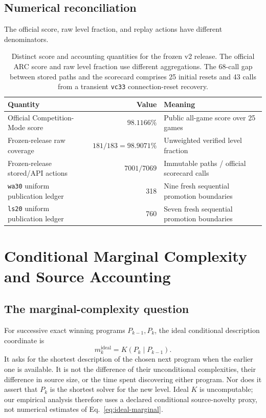 \documentclass[11pt]{article}
\theoremstyle{definition}
\theoremstyle{remark}
\begin{document}
\subsection{Numerical reconciliation}
The official score, raw level fraction, and replay actions have different denominators.
\begin{table}[H]
\centering
\small
\begin{tabularx}{\textwidth}{@{}p{}rX@{}}
\toprule
Quantity & Value & Meaning \\
\midrule
Official Competition-Mode score & $98.1166\%$ & Public all-game score over 25 games \\
Frozen-release raw coverage & $181/183=98.9071\%$ & Unweighted verified level fraction \\
Frozen-release stored/API actions & $7001/7069$ & Immutable paths / official scorecard calls \\
\texttt{wa30} uniform publication ledger & 318 & Nine fresh sequential promotion boundaries \\
\texttt{ls20} uniform publication ledger & 760 & Seven fresh sequential promotion boundaries \\
\bottomrule
\end{tabularx}
\caption{Distinct score and accounting quantities for the frozen v2 release. The
official ARC score and raw level fraction use different aggregations. The 68-call gap
between stored paths and the scorecard comprises 25 initial resets and 43 calls from a
transient \texttt{vc33} connection-reset recovery.}
\label{tab:numerical-reconciliation}
\end{table}

\section{Conditional Marginal Complexity and Source Accounting}
\label{sec:accounting}
\subsection{The marginal-complexity question}
\label{sec:marginal-definition}
For successive exact winning programs $P_{k-1},P_k$, the ideal conditional
description coordinate is
\begin{equation}
 m_k^{\mathrm{ideal}}=K(P_k\mid P_{k-1}).
 \label{eq:ideal-marginal}
\end{equation}
It asks for the shortest description of the chosen next program when the earlier
one is available. It is not the difference of their unconditional complexities,
their difference in source size, or the time spent discovering either program.
Nor does it assert that $P_k$ is the shortest solver for the new level. Ideal $K$
is uncomputable; our empirical analysis therefore uses a declared conditional
source-novelty proxy, not numerical estimates of Eq.~\eqref{eq:ideal-marginal}.
\end{document}
